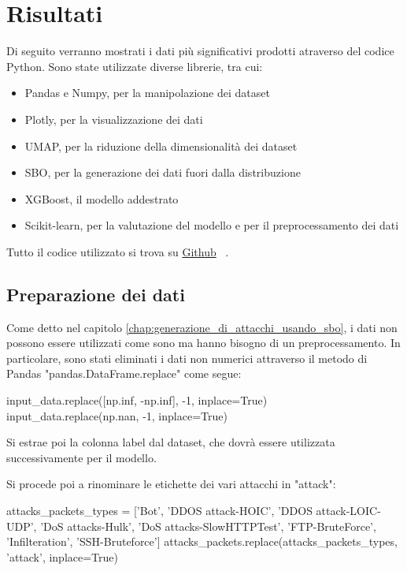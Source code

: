 \chapter{Risultati}
\label{chap:risultati}

Di seguito verranno mostrati i dati più significativi prodotti atraverso del codice Python. Sono state utilizzate diverse librerie, tra cui:

\begin{itemize}
    \item Pandas e Numpy, per la manipolazione dei dataset
    \item Plotly, per la visualizzazione dei dati
    \item UMAP, per la riduzione della dimensionalità dei dataset 
    \item SBO, per la generazione dei dati fuori dalla distribuzione
    \item XGBoost, il modello addestrato
    \item Scikit-learn, per la valutazione del modello e per il preprocessamento dei dati
\end{itemize}

Tutto il codice utilizzato si trova su \href{https://github.com/guglielmobartelloni/thesis-utils}{Github}~\cite{github} .

\section{Preparazione dei dati}

Come detto nel capitolo \ref{chap:generazione_di_attacchi_usando_sbo}, i dati non possono essere utilizzati come sono ma hanno bisogno di un preprocessamento. In particolare, sono stati eliminati i dati non numerici attraverso il metodo di Pandas "pandas.DataFrame.replace" come segue:


\begin{python}
input_data.replace([np.inf, -np.inf], -1, inplace=True)
input_data.replace(np.nan, -1, inplace=True)
\end{python}

Si estrae poi la colonna label dal dataset, che dovrà essere utilizzata successivamente per il modello.

Si procede poi a rinominare le etichette dei vari attacchi in "attack":

\begin{python}
attacks_packets_types = ['Bot', 'DDOS attack-HOIC', 'DDOS attack-LOIC-UDP',
                          'DoS attacks-Hulk', 'DoS attacks-SlowHTTPTest', 
                          'FTP-BruteForce', 
                          'Infilteration', 'SSH-Bruteforce']
attacks_packets.replace(attacks_packets_types, 'attack', inplace=True)
\end{python}

